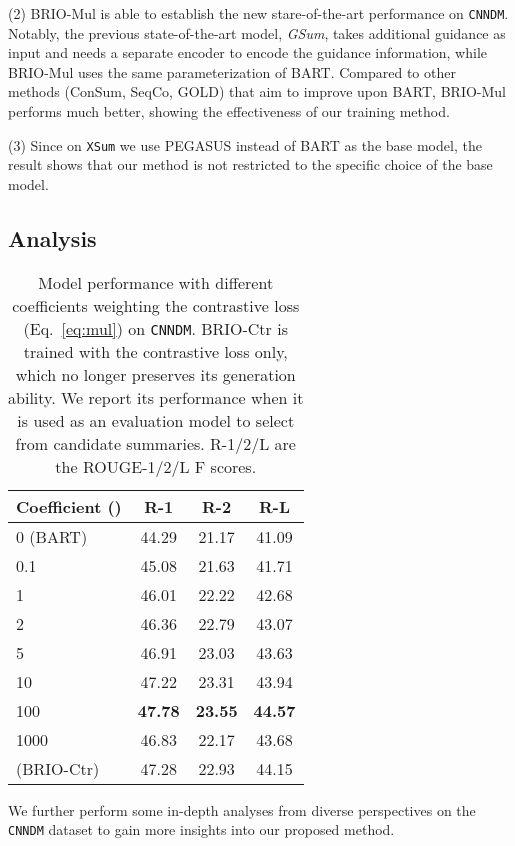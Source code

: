 \documentclass[11pt]{article}
\newcommand{\model}{BRIO\xspace}
\begin{document}
(2) \model-Mul is able to establish the new stare-of-the-art performance on \texttt{CNNDM}.
Notably, the previous state-of-the-art model, \textit{GSum}, takes additional guidance as input and needs a separate encoder to encode the guidance information, while \model-Mul uses the same parameterization of BART.
Compared to other methods (ConSum, SeqCo, GOLD) that aim to improve upon BART, \model-Mul performs much better, showing the effectiveness of our training method.

(3) Since on \texttt{XSum} we use PEGASUS instead of BART as the base model, the result shows that our method is not restricted to the specific choice of the base model.

\subsection{Analysis}
\label{subsec:analysis}

\begin{table}[t!]
\centering
\small
\begin{tabular}{lccc}
\toprule
\textbf{Coefficient ()} & \textbf{R-1} & \textbf{R-2} & \textbf{R-L}  \\
\midrule
 0 (BART) & 44.29 & 21.17 & 41.09 \\
 0.1 & 45.08  & 21.63  & 41.71  \\
 1 & 46.01 & 22.22 & 42.68  \\
 2 & 46.36 & 22.79 & 43.07 \\
 5 & 46.91 & 23.03 & 43.63 \\
 10 & 47.22 & 23.31 & 43.94 \\
 100 & \textbf{47.78} & \textbf{23.55} & \textbf{44.57} \\
 1000 & 46.83 & 22.17 & 43.68 \\
  \small(\model-Ctr) & 47.28 & 22.93 & 44.15 \\
\bottomrule
\end{tabular}
\caption{\label{tab:coeff} Model performance with different  coefficients weighting the contrastive loss (Eq.~\ref{eq:mul}) on \texttt{CNNDM}. 
\model-Ctr is trained with the contrastive loss only, which no longer preserves its generation ability. 
We report its performance when it is used as an evaluation model to select from candidate summaries.
R-1/2/L are the ROUGE-1/2/L F scores. }
\end{table}

We further perform some in-depth analyses from diverse perspectives on the \texttt{CNNDM} dataset to gain more insights into our proposed method.
\end{document}
